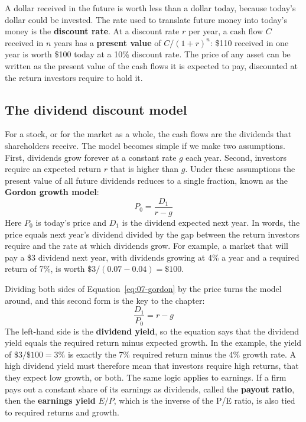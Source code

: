 A dollar received in the future is worth less than a dollar today, because today's dollar could be invested. The rate used to translate future money into today's money is the \textbf{discount rate}. At a discount rate $r$ per year, a cash flow $C$ received in $n$ years has a \textbf{present value} of $C/(1 + r)^n$: \$110 received in one year is worth \$100 today at a 10\% discount rate. The price of any asset can be written as the present value of the cash flows it is expected to pay, discounted at the return investors require to hold it.

\subsection{The dividend discount model}

For a stock, or for the market as a whole, the cash flows are the dividends that shareholders receive. The model becomes simple if we make two assumptions. First, dividends grow forever at a constant rate $g$ each year. Second, investors require an expected return $r$ that is higher than $g$. Under these assumptions the present value of all future dividends reduces to a single fraction, known as the \textbf{Gordon growth model}:
\begin{equation}
  P_0 = \frac{D_1}{r - g}
  \label{eq:07-gordon}
\end{equation}
Here $P_0$ is today's price and $D_1$ is the dividend expected next year. In words, the price equals next year's dividend divided by the gap between the return investors require and the rate at which dividends grow. For example, a market that will pay a \$3 dividend next year, with dividends growing at 4\% a year and a required return of 7\%, is worth $\$3/(0.07 - 0.04) = \$100$.

Dividing both sides of Equation~\eqref{eq:07-gordon} by the price turns the model around, and this second form is the key to the chapter:
\begin{equation}
  \frac{D_1}{P_0} = r - g
  \label{eq:07-gordon-yield}
\end{equation}
The left-hand side is the \textbf{dividend yield}, so the equation says that the dividend yield equals the required return minus expected growth. In the example, the yield of $\$3/\$100 = 3\%$ is exactly the 7\% required return minus the 4\% growth rate. A high dividend yield must therefore mean that investors require high returns, that they expect low growth, or both. The same logic applies to earnings. If a firm pays out a constant share of its earnings as dividends, called the \textbf{payout ratio}, then the \textbf{earnings yield} $E/P$, which is the inverse of the P/E ratio, is also tied to required returns and growth.

